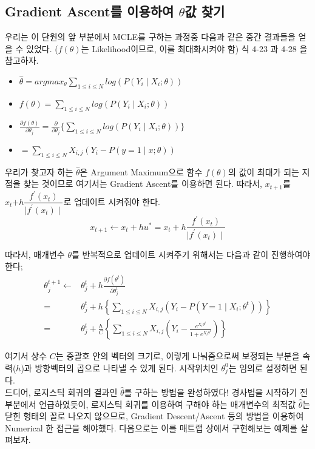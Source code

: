 \documentclass[a4paper]{oblivoir}
\begin{document}
\subsection{Gradient Ascent를 이용하여 \texorpdfstring{$\theta$}{Lg}값 찾기}
우리는 이 단원의 앞 부분에서 MCLE를 구하는 과정중 다음과 같은 중간 결과들을 얻을 수 있었다. ($f(\theta)$는 Likelihood이므로, 이를 최대화시켜야 함) 식 4-23 과 4-28 을 참고하자.
\begin{itemize}
\item $\hat{\theta} = argmax_{\theta}\sum_{1 \leq i \leq N}log(P(Y_{i} \mid X_{i}; \theta))$
\item $f(\theta) = \sum_{1 \leq i \leq N}log(P(Y_{i} \mid X_{i}; \theta))$
\item $\frac{\partial f(\theta)}{\partial \theta_{j}} = \frac{\partial}{\partial \theta_{j}}\{ \sum_{1 \leq i \leq N}log(P(Y_{i} \mid X_{i}; \theta)) \}$
\item[] $= \sum_{1 \leq i \leq N}X_{i, j}(Y_{i} - P(y=1 \mid x; \theta))$
\end{itemize}

\indent 우리가 찾고자 하는 $\hat{\theta}$은 Argument Maximum으로 함수 $f(\theta)$의 값이 최대가 되는 지점을 찾는 것이므로 여기서는 Gradient Ascent를 이용하면 된다. 따라서, $x_{t+1}$를 $x_{t}\textbf{+}h\dfrac{f^{\prime}(x_{t})}{\mid f^{\prime}(x_{t}) \mid}$로 업데이트 시켜줘야 한다.
\begin{equation*}
x_{t+1} \gets x_{t} + h\textbf{$u^{\ast}$} = x_{t} + h\frac{f^{\prime}(x_{t})}{\mid f^{\prime}(x_{t}) \mid} \tag{4-48}
\end{equation*}

\indent 따라서, 매개변수 \textbf{$\theta$}를 반복적으로 업데이트 시켜주기 위해서는 다음과 같이 진행하여야 한다;
\begin{align*}
\theta_{j}^{t+1} \gets & \theta_{j}^{t} + h\frac{\partial f(\theta^{t})}{\partial \theta_{j}^{t}} \tag{4-49}\\
= &\theta_{j}^{t} + h\left\{ \sum_{1 \leq i \leq N}X_{i, j}(Y_{i}-P(Y=1 \mid X_{i}; \theta^{t})) \right\} \tag{4-50} \\
= &\theta_{j}^{t} + \frac{h}{C}\left \{ \sum_{1 \leq i \leq N}X_{i, j}\left(Y_{i}-\frac{e^{X_{i}\theta^{t}}}{1+e^{X_{i}\theta^{t}}}\right) \right \} \tag{4-51}
\end{align*}

\indent 여기서 상수 $C$는 중괄호 안의 벡터의 크기로, 이렇게 나눠줌으로써 보정되는 부분을 속력($h$)과 방향벡터의 곱으로 나타낼 수 있게 된다. 시작위치인 $\theta_{j}^{0}$는 임의로 설정하면 된다. \\
\indent 드디어, 로지스틱 회귀의 결과인 $\hat{\theta}$를 구하는 방법을 완성하였다! 경사법을 시작하기 전 부분에서 언급하였듯이, 로지스틱 회귀를 이용하여 구해야 하는 매개변수의 최적값 $\hat{\theta}$는 닫힌 형태의 꼴로 나오지 않으므로, Gradient Descent/Ascent 등의 방법을 이용하여 Numerical 한 접근을 해야했다. 다음으로는 이를 매트랩 상에서 구현해보는 예제를 살펴보자.
\end{document}
